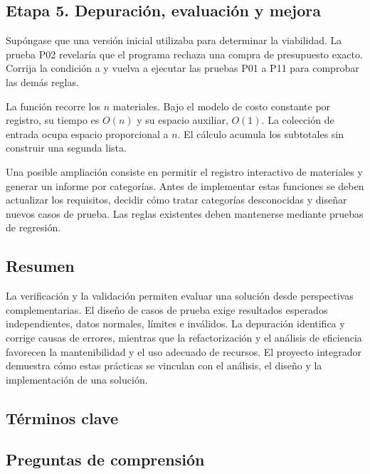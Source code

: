 \subsection{Etapa 5. Depuración, evaluación y mejora}

Supóngase que una versión inicial utilizaba  para determinar la viabilidad. La prueba P02 revelaría que el programa rechaza una compra de presupuesto exacto. Corrija la condición a  y vuelva a ejecutar las pruebas P01 a P11 para comprobar las demás reglas.

La función  recorre los \(n\) materiales. Bajo el modelo de costo constante por registro, su tiempo es \(O(n)\) y su espacio auxiliar, \(O(1)\). La colección de entrada ocupa espacio proporcional a \(n\). El cálculo acumula los subtotales sin construir una segunda lista.

Una posible ampliación consiste en permitir el registro interactivo de materiales y generar un informe por categorías. Antes de implementar estas funciones se deben actualizar los requisitos, decidir cómo tratar categorías desconocidas y diseñar nuevos casos de prueba. Las reglas existentes deben mantenerse mediante pruebas de regresión.


\subsection{Resumen}

La verificación y la validación permiten evaluar una solución desde perspectivas complementarias. El diseño de casos de prueba exige resultados esperados independientes, datos normales, límites e inválidos. La depuración identifica y corrige causas de errores, mientras que la refactorización y el análisis de eficiencia favorecen la mantenibilidad y el uso adecuado de recursos. El proyecto integrador demuestra cómo estas prácticas se vinculan con el análisis, el diseño y la implementación de una solución.

\subsection{Términos clave}



\subsection{Preguntas de comprensión}

